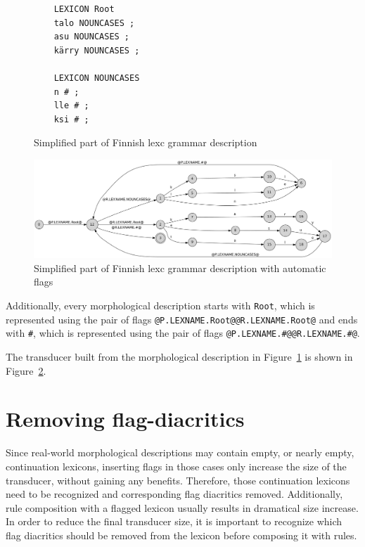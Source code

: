\documentclass[final]{beamer}
\begin{document}
\begin{poster}
\begin{figure}
    \centering
    \begin{verbatim}
    LEXICON Root
    talo NOUNCASES ;
    asu NOUNCASES ;
    kärry NOUNCASES ;

    LEXICON NOUNCASES
    n # ;
    lle # ;
    ksi # ;
    \end{verbatim}
    \caption{Simplified part of Finnish lexc grammar description
    \label{fig:lexc-fin}}
\end{figure}

\begin{figure}
    \includegraphics[width=\textwidth]{transducer.png}
     \caption{Simplified part of Finnish lexc grammar description with automatic flags
     \label{fig:lexc-fin-flag}}
\end{figure}

Additionally,
every morphological description starts with \texttt{Root}, which is
represented using the pair of flags
\verb+@P.LEXNAME.Root@@R.LEXNAME.Root@+ and ends with \texttt{\#}, which is represented using the pair of flags \verb+@P.LEXNAME.#@@R.LEXNAME.#@+.

The transducer built from the morphological description in
Figure~\ref{fig:lexc-fin} is shown in Figure~\ref{fig:lexc-fin-flag}.




\newcolumn

\section{Removing flag-diacritics }
\justifying
Since real-world morphological descriptions may contain empty, or nearly
empty, continuation lexicons, inserting flags in those cases only
increase the size of the transducer, without gaining any
benefits. Therefore, those continuation lexicons need to be recognized and corresponding flag diacritics removed.
Additionally, rule composition with a flagged lexicon usually results in dramatical size
increase. In order to reduce the final transducer size, it is important to recognize which flag diacritics should be removed from the lexicon 
before composing it with rules.  


\end{poster}
\end{document}
